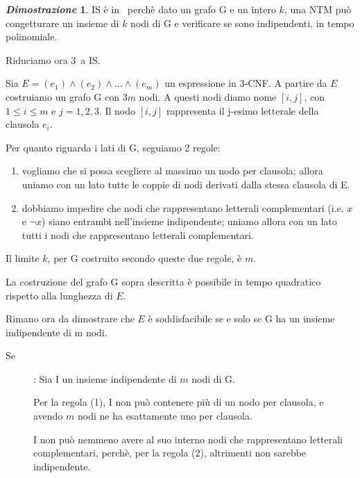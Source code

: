 \documentclass[12pt]{article}
\theoremstyle{definition}
\newtheorem*{myproof}{\em Dimostrazione}
\begin{document}
\begin{myproof}
  IS \`e in \NP\ perch\`e dato un grafo G e un intero \(k\), una NTM pu\`o
  congetturare un insieme di \(k\) nodi di G e verificare se sono indipendenti,
  in tempo polinomiale.

  Riduciamo ora 3\SAT\ a IS.

  Sia \(E = (e_1) \land (e_2) \land \ldots \land (e_m)\) un espressione in 3-CNF. A partire da \(E\) 
  costruiamo un grafo G con \(3m\) nodi. A questi nodi diamo nome \([i, j]\), con \(1 \leq i \leq m\) e
  \(j = 1,2,3\). Il nodo \([i, j]\) rappresenta il j-esimo letterale della clausola \(e_i\).

  Per quanto riguarda i lati di G, seguiamo 2 regole:

  \begin{enumerate}
    
    \item vogliamo che si possa scegliere al massimo un nodo per clausola; allora uniamo con un lato
      tutte le coppie di nodi derivati dalla stessa clausola di E.\newline

    \item dobbiamo impedire che nodi che rappresentano letterali complementari (i.e. \(x\) e \(\lnot x\))
      siano entrambi nell'insieme indipendente; uniamo allora con un lato tutti i nodi che rappresentano
      letterali complementari.

  \end{enumerate}

  Il limite \(k\), per G costruito secondo queste due regole, \`e \(m\).

  La costruzione del grafo G sopra descritta \`e possibile in tempo quadratico rispetto alla lunghezza di \(E\).

  Rimano ora da dimostrare che \(E\) \`e soddisfacibile se e solo se G ha un insieme indipendente di m nodi.

  \begin{description}

  \item[Se]: Sia I un insieme indipendente di \(m\) nodi di G.\newline

    Per la regola (1), I non pu\`o contenere pi\`u di un nodo per clausola, e avendo \(m\) nodi ne ha esattamente uno per clausola.\newline

    I non pu\`o nemmeno avere al suo interno nodi che rappresentano letterali complementari, perch\`e, per la regola (2), altrimenti non
    sarebbe indipendente.\newline


\end{description}
\end{myproof}
\end{document}
